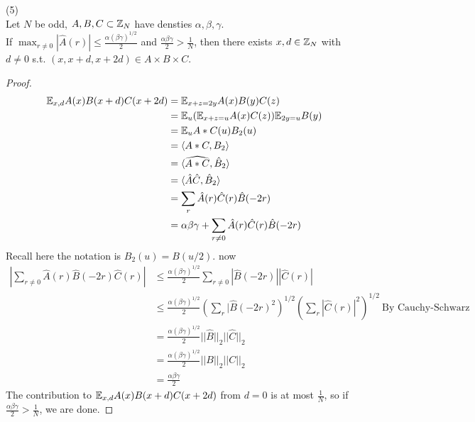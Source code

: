 \documentclass[a4paper]{article}
\begin{document}
\begin{lemma} (5)\\
    Let $N$ be odd, $A,B,C \subset \mathbb{Z}_N$ have densties $\alpha,\beta,\gamma$.\\
    If $\max_{r \neq 0} |\hat{A}(r)| \leq \frac{\alpha(\beta\gamma)^{1/2}}{2}$ and $\frac{\alpha\beta\gamma}{2} > \frac{1}{N}$, then there exists $x,d \in \mathbb{Z}_N$ with $d \neq 0$ s.t. $(x,x+d,x+2d) \in A \times B \times C$.
    \begin{proof}
        \begin{equation*}
            \begin{aligned}
                \mathbb{E}_{x,d} A(x) B(x+d) C(x+2d) &= \mathbb{E}_{x+z=2y} A(x)B(y)C(z)\\
                &=\mathbb{E}_u (\mathbb{E}_{x+z=u}A(x)C(z)) \mathbb{E}_{2y=u} B(y)\\
                &=\mathbb{E}_u A * C(u) B_2(u)\\
                &=\langle A*C,B_2\rangle\\
                &=\langle\widehat{A*C},\hat{B}_2\rangle\\
                &=\langle \hat{A}\hat{C},\hat{B}_2\rangle\\
                &=\sum_r \hat{A}(r)\hat{C}(r)\hat{B}(-2r)\\
                &=\alpha\beta\gamma + \sum_{r \neq 0} \hat{A}(r)\hat{C}(r)\hat{B}(-2r)
            \end{aligned}
        \end{equation*}
        Recall here the notation is $B_2(u) = B(u/2)$. now
        \begin{equation*}
            \begin{aligned}
                |\sum_{r\neq 0} \hat{A}(r)\hat{B}(-2r)\hat{C}(r)| &\leq \frac{\alpha(\beta\gamma)^{1/2}}{2}\sum_{r \neq 0} |\hat{B}(-2r)||\hat{C}(r)|\\
                &\leq \frac{\alpha(\beta\gamma)^{1/2}}{2} \left(\sum_r |\hat{B}(-2r)^2\right)^{1/2}\left(\sum_r |\hat{C}(r)|^2\right)^{1/2} \ \text{By Cauchy-Schwarz}\\
                &=\frac{\alpha(\beta\gamma)^{1/2}}{2} ||\hat{B}||_2 ||\hat{C}||_2\\
                &= \frac{\alpha(\beta\gamma)^{1/2}}{2} ||B||_2||C||_2\\
                &= \frac{\alpha\beta\gamma}{2}
            \end{aligned}
        \end{equation*}
        The contribution to $\mathbb{E}_{x,d} A(x)B(x+d)C(x+2d)$ from $d=0$ is at most $\frac{1}{N}$, so if $\frac{\alpha\beta\gamma}{2} > \frac{1}{N}$, we are done.
    \end{proof}
\end{lemma}
\end{document}
